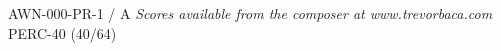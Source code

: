 \documentclass[11pt]{report}
\begin{document}
\null \vfill

AWN-000-PR-1 / A \hfill
\textit{Scores available from the composer at www.trevorbaca.com}
\hfill PERC-40 (40/64)
\end{document}
